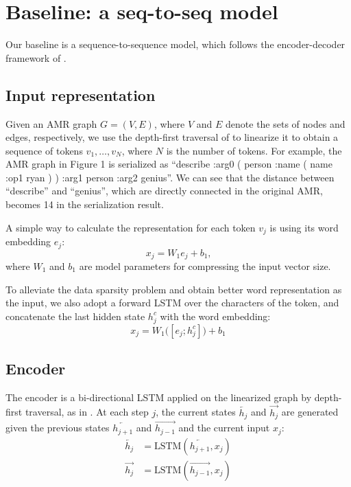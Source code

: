 \documentclass[11pt,a4paper]{article}
\begin{document}
\section{Baseline: a seq-to-seq model}
\label{sec:base}

Our baseline is a sequence-to-sequence model, which follows the encoder-decoder framework of .

\subsection{Input representation}
\label{sec:base_inp}

Given an AMR graph $G=(V,E)$, where $V$ and $E$ denote the sets of nodes and edges, respectively, we use the depth-first traversal of  to linearize it to obtain a sequence of tokens $v_1, \dots, v_N$, where $N$ is the number of tokens.
For example, the AMR graph in Figure 1 is serialized as ``describe :arg0 ( person :name ( name :op1 ryan )  )  :arg1 person :arg2 genius''.
We can see that the distance between ``describe'' and ``genius'', which are directly connected in the original AMR,  becomes 14 in the serialization result.


A simple way to calculate the representation for each token $v_j$ is using its word embedding $e_j$:
\begin{equation}
x_j = W_1 e_{j} + b_1 \textrm{,}
\label{eq:base_inp}
\end{equation}
where $W_1$ and $b_1$ are model parameters for compressing the input vector size.


To alleviate the data sparsity problem and obtain better word representation as the input, we also adopt a forward LSTM over the characters of the token, and concatenate the last hidden state $h_{j}^c$ with the word embedding:
\begin{equation}
x_j = W_1 \Big( [e_{j}; h_{j}^c] \Big) + b_1
\label{eq:base_inp_2}
\end{equation} 


\subsection{Encoder}
\label{sec:base_enc}

The encoder is a bi-directional LSTM applied on the linearized graph by depth-first traversal, as in .
At each step $j$, the current states $\overleftarrow{h_j}$ and $\overrightarrow{h_j}$ are generated given the previous states $\overleftarrow{h_{j+1}}$ and $\overrightarrow{h_{j-1}}$ and the current input $x_j$:
\begin{align*}
\overleftarrow{h_j} &= \textrm{LSTM}(\overleftarrow{h_{j+1}}, x_j) \\
\overrightarrow{h_j} &= \textrm{LSTM}(\overrightarrow{h_{j-1}}, x_j)
\end{align*}
\end{document}
